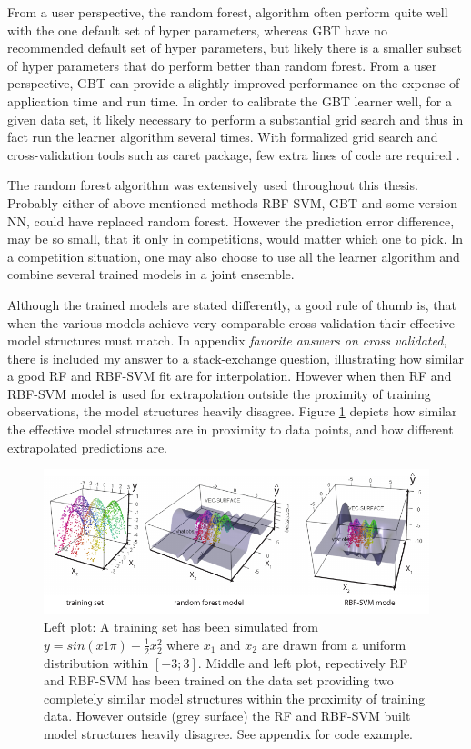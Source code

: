 From a user perspective, the random forest, algorithm often perform quite well with the one default set of hyper parameters, whereas GBT have no recommended default set of hyper parameters, but likely there is a smaller subset of hyper parameters that do perform better than random forest. From a user perspective, GBT can provide a slightly improved performance on the expense of application time and run time. In order to calibrate the GBT learner well, for a given data set, it likely necessary to perform a substantial grid search and thus in fact run the learner algorithm several times. With formalized grid search and cross-validation tools such as caret package, few extra lines of code are required \cite{kuhn2015short}.

The random forest algorithm was extensively used throughout this thesis. Probably either of above mentioned methods RBF-SVM, GBT and some version NN, could have replaced random forest. However the prediction error difference, may be so small, that it only in competitions, would matter which one to pick. In a competition situation, one may also choose to use all the learner algorithm and combine several trained models in a joint ensemble. 

Although the trained models are stated differently, a good rule of thumb is, that when the various models achieve very comparable cross-validation their effective model structures must match. In appendix \textit{favorite answers on cross validated}, there is included my answer to a stack-exchange question, illustrating how similar a good RF and RBF-SVM fit are for interpolation. However when then RF and RBF-SVM model is used for extrapolation outside the proximity of training observations, the model structures heavily disagree. Figure \ref{svmVSrf} depicts how similar the effective model structures are in proximity to data points, and how different extrapolated predictions are.

\begin{figure}[!htbp]
\includegraphics[width=\textwidth,height=\textheight,keepaspectratio]{graphics/svmVSrf.pdf}
\caption{Left plot: A training set has been simulated from  $y = sin(x1 \pi) − \frac 1 2 x_2^2$ where $x_1$ and $x_2$ are drawn from a uniform distribution within $[-3;3]$. Middle and left plot, repectively RF and RBF-SVM has been trained on the data set providing two completely similar model structures within the proximity of training data. However outside (grey surface) the RF and RBF-SVM built model structures heavily disagree. See appendix for code example.}
\label{svmVSrf}
\end{figure}


